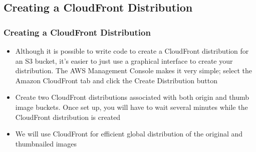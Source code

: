 \documentclass{beamer}
\begin{document}
\subsection{Creating a CloudFront Distribution}
\begin{frame}[fragile]
\frametitle{Creating a CloudFront Distribution}

\begin{itemize}
\item Although it is possible to write code to create a CloudFront distribution for an S3
bucket, it’s easier to just use a graphical interface to create your distribution.
The AWS Management Console makes it very simple; select the Amazon
CloudFront tab and click the Create Distribution button

\item Create two CloudFront distributions associated with both origin and thumb image buckets. Once set up, you will have to wait several minutes while the CloudFront distribution is created
\item We will use CloudFront for efficient global distribution of the original and thumbnailed images

\end{itemize}

\end{frame}
\end{document}
